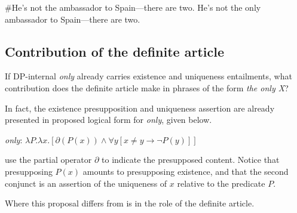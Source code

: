 \begin{exe}
	\ex \#He's not the ambassador to Spain---there are two.
	\ex He's not the only ambassador to Spain---there are two.
\end{exe}

\subsection{Contribution of the definite article}
If DP-internal \textit{only} already carries existence and uniqueness entailments, what contribution does the definite article make in phrases of the form \textit{the only X}?

In fact, the existence presupposition and uniqueness assertion are already presented in  proposed logical form for \textit{only}, given below.

\begin{exe}
	\ex \textit{only}: $ \lambda P . \lambda x . [ \partial(P(x)) \land \forall y [ x \ne y \to \neg P(y) ] ] $
\end{exe}

\citeauthor{cb2015} use the partial operator $\partial$ to indicate the presupposed content. Notice that presupposing $P(x)$ amounts to presupposing existence, and that the second conjunct is an assertion of the uniqueness of $x$ relative to the predicate $P$.

Where this proposal differs from  is in the role of the definite article.